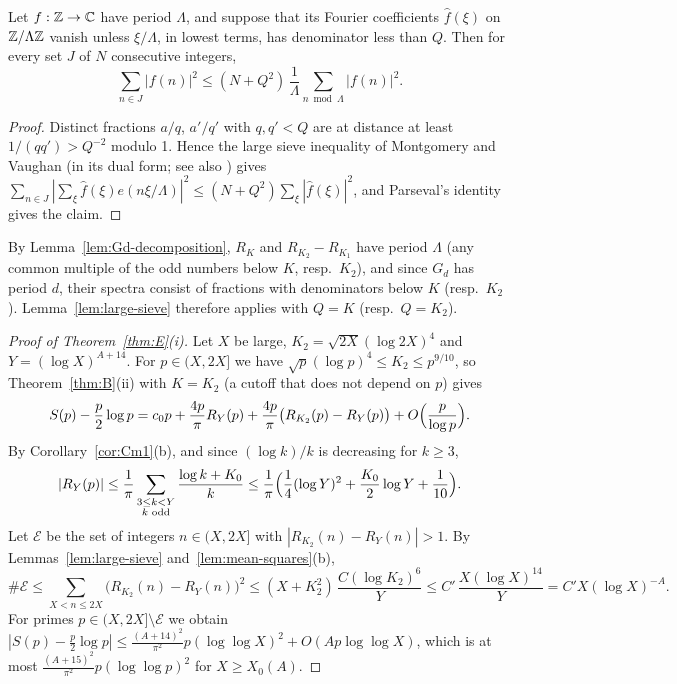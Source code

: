 \begin{lemma}\label{lem:large-sieve}
Let $f:\mathbb{Z}\to\mathbb{C}$ have period $\Lambda$, and suppose that its Fourier coefficients $\hat f(\xi)$ on $\mathbb{Z}/\Lambda\mathbb{Z}$ vanish unless $\xi/\Lambda$, in lowest terms, has denominator less than $Q$. Then for every set $J$ of $N$ consecutive integers,
\[
\sum_{n\in J}|f(n)|^2\le(N+Q^2)\,\frac1\Lambda \sum_{n\bmod \Lambda}|f(n)|^2.
\]
\end{lemma}

\begin{proof}
Distinct fractions $a/q$, $a'/q'$ with $q,q'<Q$ are at distance at least $1/(qq')>Q^{-2}$ modulo 1. Hence the large sieve inequality of Montgomery and Vaughan \cite{b20} (in its dual form; see also \cite{b15}) gives $\sum_{n\in J}|\sum_\xi\hat f(\xi)e(n\xi/\Lambda)|^2\le(N+Q^2)\sum_\xi|\hat f(\xi)|^2$, and Parseval's identity gives the claim.
\end{proof}

By Lemma~\ref{lem:Gd-decomposition}, $R_K$ and $R_{K_2}-R_{K_1}$ have period $\Lambda$ (any common multiple of the odd numbers below $K$, resp.\ $K_2$), and since $G_d$ has period $d$, their spectra consist of fractions with denominators below $K$ (resp.\ $K_2$). Lemma~\ref{lem:large-sieve} therefore applies with $Q=K$ (resp.\ $Q=K_2$).

\begin{proof}[Proof of Theorem~\textup{\ref{thm:E}(i)}]
Let $X$ be large, $K_2=\sqrt{2X}(\log 2X)^4$ and $Y=(\log X)^{A+14}$. For $p\in(X,2X]$ we have $\sqrt p(\log p)^4\le K_2\le p^{9/10}$, so Theorem~\ref{thm:B}(ii) with $K=K_2$ (a cutoff that does not depend on $p$) gives
\[
S(p)-\frac p2\log p=c_0p+\frac{4p}{\pi}R_Y(p)+\frac{4p}{\pi}\bigl(R_{K_2}(p)-R_Y(p)\bigr)+O\Bigl(\frac{p}{\log p}\Bigr).
\]
By Corollary~\ref{cor:Cm1}(b), and since $(\log k)/k$ is decreasing for $k\ge 3$,
\[
|R_Y(p)|\le\frac1\pi\sum_{\substack{3\le k<Y\\ k\text{ odd}}}\frac{\log k+K_0}{k}\le\frac1\pi\Bigl(\frac14(\log Y)^2+\frac{K_0}{2}\log Y+\frac1{10}\Bigr).
\]
Let $\mathcal E$ be the set of integers $n\in(X,2X]$ with $|R_{K_2}(n)-R_Y(n)|>1$. By Lemmas~\ref{lem:large-sieve} and~\ref{lem:mean-squares}(b),
\[
\#\mathcal E\le\sum_{X<n\le 2X}\bigl(R_{K_2}(n)-R_Y(n)\bigr)^2\le(X+K_2^2)\,\frac{C(\log K_2)^6}{Y}\le C'\,\frac{X(\log X)^{14}}{Y}=C'X(\log X)^{-A}.
\]
For primes $p\in(X,2X]\setminus\mathcal E$ we obtain $|S(p)-\frac p2\log p|\le\frac{(A+14)^2}{\pi^2}p(\log\log X)^2+O(Ap\log\log X)$, which is at most $\frac{(A+15)^2}{\pi^2}p(\log\log p)^2$ for $X\ge X_0(A)$.
\end{proof}


